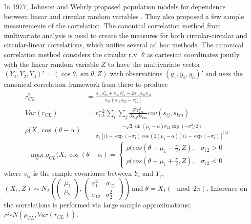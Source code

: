In 1977, Johnson and Wehrly proposed population models for dependence between linear and circular random variables \cite{johnson_measures_1977}. They also proposed a few sample measurements of the correlation. The canonical correlation method from multivariate analysis is used to create the measures for both circular-circular and circular-linear correlations, which unifies several ad hoc methods. The canonical correlation method considers the circular r.v. $\theta$ as cartesian coordinates jointly with the linear random variable $Z$ to have the multivariate vector $(Y_1, Y_2, Y_3)' = (\cos\theta, \sin\theta, Z)$ with observations $(y_1, y_2, y_3)'$ and uses the canonical correlation framework from there to produce 
\begin{align*}
    r_{CL}^2 &= \frac{s_{11} s_{23}^2 + s_{22} s_{13}^2 - 2s_{12}s_{23}s_{31}}{s_{33}(s_{11}s_{22} - s_{12}^2)} \\
    Var(r_{CL}) &= r_{CL}^{-2} \sum_i \sum_j \frac{\partial^2 r_{CL}^2}{\partial s_{ij}\partial s_{km}} cov(s_{ij}, s_{km}) \\
    \rho(X, \cos(\theta - \alpha) &= \frac{-\sqrt{2} \sin(\mu_1 - \alpha)\sigma_{12}\exp(-\sigma_1^2 / 2)}{\sigma_2 [(1 - \exp(-\sigma_1^2)\cos(2(\mu_1 - \alpha))(1 - \exp(-\sigma_1^2)]^{1/2}}
\end{align*}
\[
\max_\alpha \rho_{CL}(X, \cos(\theta - \alpha) =\begin{cases}
    \rho(cos(\theta - \mu_1 - \frac{\pi}{2}, Z), & \sigma_{12} > 0 \\
    \rho(cos(\theta - \mu_1 + \frac{\pi}{2}, Z), & \sigma_{12} < 0
    \end{cases}
\] where $s_{ij}$ is the sample covariance between $Y_i$ and $Y_j$, $(X_1, Z) \sim N_2\left(\begin{pmatrix}\mu_1 \\ \mu_2 \end{pmatrix}, \begin{pmatrix}\sigma_1^2 & \sigma_{12} \\ \sigma_{12} & \sigma_2^2 \end{pmatrix}\right)$ and $\theta = X_1 (\mod 2\pi)$. Inference on the correlations is performed via large sample approximations; $r \dot{\sim} N(\rho_{CL}, Var(r_{CL}))$. 

